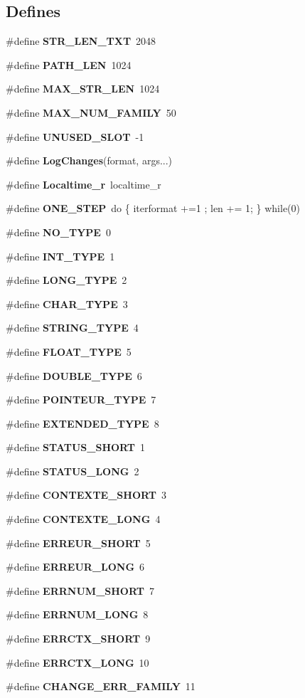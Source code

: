 \subsection*{Defines}
\begin{DoxyCompactItemize}
\item 
\#define {\bf STR\_\-LEN\_\-TXT}~2048
\item 
\#define {\bf PATH\_\-LEN}~1024
\item 
\#define {\bf MAX\_\-STR\_\-LEN}~1024
\item 
\#define {\bf MAX\_\-NUM\_\-FAMILY}~50
\item 
\#define {\bf UNUSED\_\-SLOT}~-\/1
\item 
\#define {\bf LogChanges}(format, args...)
\item 
\#define {\bf Localtime\_\-r}~localtime\_\-r
\item 
\#define {\bf ONE\_\-STEP}~do \{ iterformat +=1 ; len += 1; \} while(0)
\item 
\#define {\bf NO\_\-TYPE}~0
\item 
\#define {\bf INT\_\-TYPE}~1
\item 
\#define {\bf LONG\_\-TYPE}~2
\item 
\#define {\bf CHAR\_\-TYPE}~3
\item 
\#define {\bf STRING\_\-TYPE}~4
\item 
\#define {\bf FLOAT\_\-TYPE}~5
\item 
\#define {\bf DOUBLE\_\-TYPE}~6
\item 
\#define {\bf POINTEUR\_\-TYPE}~7
\item 
\#define {\bf EXTENDED\_\-TYPE}~8
\item 
\#define {\bf STATUS\_\-SHORT}~1
\item 
\#define {\bf STATUS\_\-LONG}~2
\item 
\#define {\bf CONTEXTE\_\-SHORT}~3
\item 
\#define {\bf CONTEXTE\_\-LONG}~4
\item 
\#define {\bf ERREUR\_\-SHORT}~5
\item 
\#define {\bf ERREUR\_\-LONG}~6
\item 
\#define {\bf ERRNUM\_\-SHORT}~7
\item 
\#define {\bf ERRNUM\_\-LONG}~8
\item 
\#define {\bf ERRCTX\_\-SHORT}~9
\item 
\#define {\bf ERRCTX\_\-LONG}~10
\item 
\#define {\bf CHANGE\_\-ERR\_\-FAMILY}~11
\item 

\end{DoxyCompactItemize}
